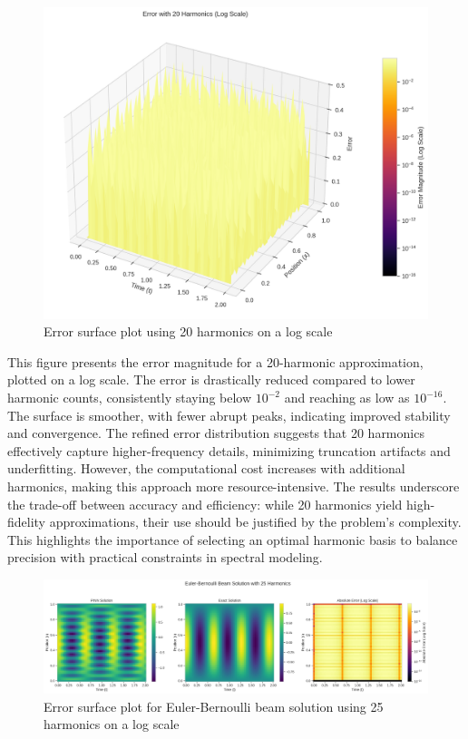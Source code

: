 \documentclass[preprint,12pt]{elsarticle}
\begin{document}
\begin{figure}[t]  
    \centering  
    \includegraphics[width=0.9\linewidth]{figures/3d_comparison_error_20h.png}  
    \caption{Error surface plot using 20 harmonics on a log scale}  
    \label{fig:error_20h}  
\end{figure}  

This figure presents the error magnitude for a 20-harmonic approximation, plotted on a log scale. The error is drastically reduced compared to lower harmonic counts, consistently staying below \(10^{-2}\) and reaching as low as \(10^{-16}\). The surface is smoother, with fewer abrupt peaks, indicating improved stability and convergence. The refined error distribution suggests that 20 harmonics effectively capture higher-frequency details, minimizing truncation artifacts and underfitting. However, the computational cost increases with additional harmonics, making this approach more resource-intensive. The results underscore the trade-off between accuracy and efficiency: while 20 harmonics yield high-fidelity approximations, their use should be justified by the problem’s complexity. This highlights the importance of selecting an optimal harmonic basis to balance precision with practical constraints in spectral modeling.  

\begin{figure}[t]
    \centering
    \includegraphics[width=0.9\linewidth]{figures/comparison_25h.png}
    \caption{Error surface plot for Euler-Bernoulli beam solution using 25 harmonics on a log scale}
    \label{fig:error_25h}
\end{figure}
\end{document}

